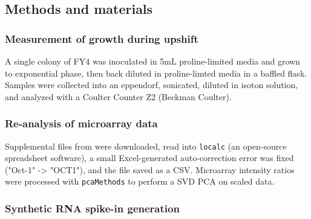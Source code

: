 
\subsection{Methods and materials}

\subsubsection{Measurement of growth during upshift}

A single colony of FY4 was inoculated in 5mL proline-limited
media and grown to exponential phase, then back diluted in
proline-limted media
in a baffled flask. 
Samples were collected into an eppendorf, sonicated,
diluted in isoton solution, and analyzed with a Coulter Counter Z2
(Beckman Coulter).

\subsubsection{Re-analysis of microarray data} 

Supplemental files from \cite{airoldi2016steady} were 
downloaded, read
into \texttt{localc} (an open-source spreadsheet software), 
a small Excel-generated auto-correction error was 
fixed ("Oct-1" -> "OCT1"), and the file saved as a CSV. Microarray 
intensity ratios were processed with 
\texttt{pcaMethods} to perform a SVD PCA on scaled data. 

\subsubsection{Synthetic RNA spike-in generation}

\label{subsubsection:spikeins}

